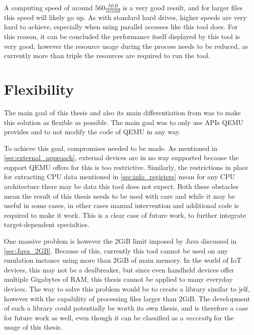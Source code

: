 A computing speed of around $560\frac{MiB}{second}$ is a very good result,
and for larger files this speed will likely go up.
As with standard hard drives, higher speeds are very hard to achieve,
especially when using parallel accesses like this tool does.
For this reason, it can be concluded the performance itself displayed by this tool is very good,
however the resource usage during the process needs to be reduced,
as currently more than triple the resources are required to run the tool.

\section{Flexibility}\label{sec:eval_flexibility}
The main goal of this thesis and also its main differentiation from \citeauthor{kitcheckpoints}
was to make this solution as flexible as possible.
The main goal was to only use APIs QEMU provides
and to not modify the code of QEMU in any way.

To achieve this goal, compromises needed to be made.
As mentioned in \autoref{sec:external_approach}, external devices are in no way supported because the support QEMU offers for this is too restrictive.
Similarly, the restrictions in place for extracting CPU data mentioned in \autoref{sec:info_registers} mean for any CPU architecture there may be data this tool does not expect.
Both these obstacles mean the result of this thesis needs to be used with care
and while it may be useful in some cases, in other cases manual intervention and additional code is required to make it work.
This is a clear case of future work, to further integrate target-dependent specialties.

One massive problem is however the 2GiB limit imposed by Java discussed in \autoref{sec:Java_2GB}.
Because of this, currently this tool cannot be used on any emulation instance using more than 2GiB of main memory.
In the world of IoT devices, this may not be a dealbreaker, but since even handheld devices offer multiple Gigabytes of RAM,
this thesis cannot be applied to many everyday devices.
The way to solve this problem would be to create a library similar to jelf\cite{jelf},
however with the capability of processing files larger than 2GiB.
The development of such a library could potentially be worth its own thesis,
and is therefore a case for future work as well,
even though it can be classified as a \emph{neccesity} for the usage of this thesis.

